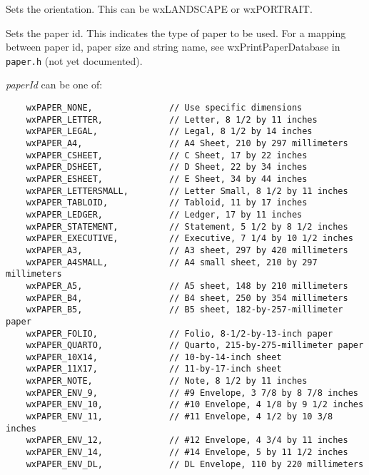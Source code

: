 
Sets the orientation. This can be wxLANDSCAPE or wxPORTRAIT.

\label{wxprintdatasetpaperid}


Sets the paper id. This indicates the type of paper to be used. For a mapping between
paper id, paper size and string name, see wxPrintPaperDatabase in {\tt paper.h} (not yet documented).

{\it paperId} can be one of:

{\small
\begin{verbatim}
    wxPAPER_NONE,               // Use specific dimensions
    wxPAPER_LETTER,             // Letter, 8 1/2 by 11 inches
    wxPAPER_LEGAL,              // Legal, 8 1/2 by 14 inches
    wxPAPER_A4,                 // A4 Sheet, 210 by 297 millimeters
    wxPAPER_CSHEET,             // C Sheet, 17 by 22 inches
    wxPAPER_DSHEET,             // D Sheet, 22 by 34 inches
    wxPAPER_ESHEET,             // E Sheet, 34 by 44 inches
    wxPAPER_LETTERSMALL,        // Letter Small, 8 1/2 by 11 inches
    wxPAPER_TABLOID,            // Tabloid, 11 by 17 inches
    wxPAPER_LEDGER,             // Ledger, 17 by 11 inches
    wxPAPER_STATEMENT,          // Statement, 5 1/2 by 8 1/2 inches
    wxPAPER_EXECUTIVE,          // Executive, 7 1/4 by 10 1/2 inches
    wxPAPER_A3,                 // A3 sheet, 297 by 420 millimeters
    wxPAPER_A4SMALL,            // A4 small sheet, 210 by 297 millimeters
    wxPAPER_A5,                 // A5 sheet, 148 by 210 millimeters
    wxPAPER_B4,                 // B4 sheet, 250 by 354 millimeters
    wxPAPER_B5,                 // B5 sheet, 182-by-257-millimeter paper
    wxPAPER_FOLIO,              // Folio, 8-1/2-by-13-inch paper
    wxPAPER_QUARTO,             // Quarto, 215-by-275-millimeter paper
    wxPAPER_10X14,              // 10-by-14-inch sheet
    wxPAPER_11X17,              // 11-by-17-inch sheet
    wxPAPER_NOTE,               // Note, 8 1/2 by 11 inches
    wxPAPER_ENV_9,              // #9 Envelope, 3 7/8 by 8 7/8 inches
    wxPAPER_ENV_10,             // #10 Envelope, 4 1/8 by 9 1/2 inches
    wxPAPER_ENV_11,             // #11 Envelope, 4 1/2 by 10 3/8 inches
    wxPAPER_ENV_12,             // #12 Envelope, 4 3/4 by 11 inches
    wxPAPER_ENV_14,             // #14 Envelope, 5 by 11 1/2 inches
    wxPAPER_ENV_DL,             // DL Envelope, 110 by 220 millimeters

\end{verbatim}}
